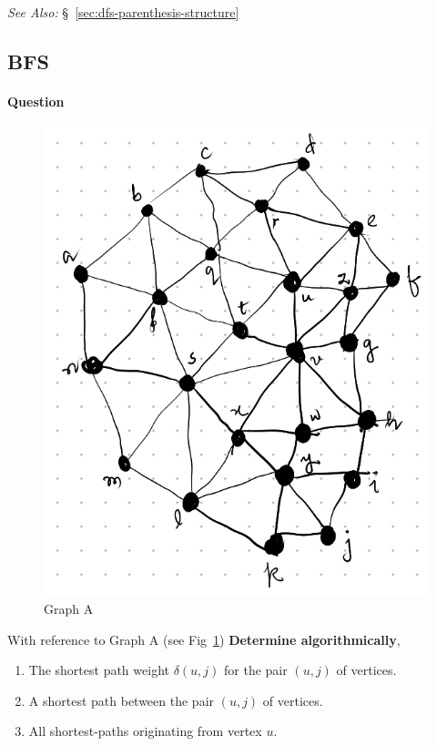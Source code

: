 \documentclass[11pt]{article}
\begin{document}
\emph{See Also:} 
\S~\ref{sec:dfs-parenthesis-structure}

\subsection{BFS}
\label{sec:orgc32bee0}

\paragraph*{Question}
\label{sec:orgf01a2f3}

\begin{figure}[htbp]
\centering
\includegraphics[width=0.5\linewidth]{images/graphA.png}
\caption{\label{fig:graphA}Graph A}
\end{figure}

With reference to Graph A (see
Fig~\ref{fig:graphA}) \textbf{Determine algorithmically},

\begin{enumerate}
\item The shortest path weight \(\delta(u,j)\) for the pair
\((u,j)\) of vertices.
\item A shortest path between the pair \((u,j)\) of
vertices.
\item All shortest-paths originating from vertex \(u\).
\end{enumerate}
\end{document}
